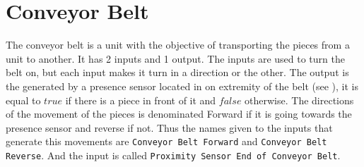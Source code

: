 
\section{Conveyor Belt}
\label{sec:magazine}
The conveyor belt is a unit with the objective of transporting the pieces from a
unit to another. It has 2 inputs and 1 output. The inputs are used to turn the
belt on, but each input makes it turn in a direction or the other. The output is
the generated by a presence sensor located in on extremity of the belt (see
), it is equal to $true$ if there is a piece in front
of it and $false$ otherwise. The directions of the movement of the pieces is
denominated Forward if it is going towards the presence sensor and reverse if
not. Thus the names given to the inputs that generate this movements are
\verb|Conveyor Belt Forward| and \verb|Conveyor Belt Reverse|.
And the input is called \verb|Proximity Sensor End of Conveyor Belt|.

